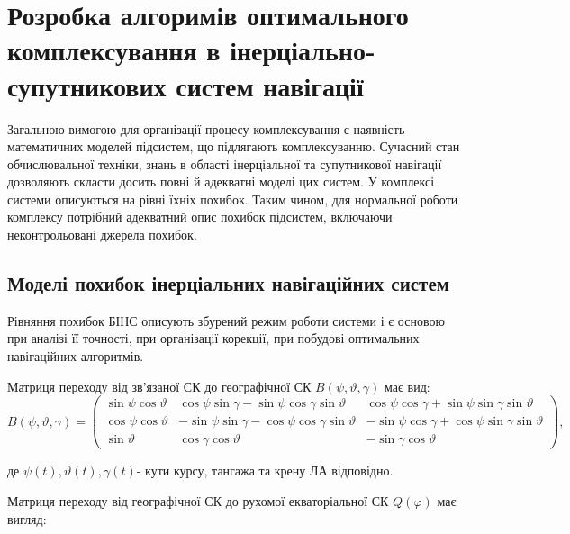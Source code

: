 \section{Розробка алгоримів оптимального комплексування в інерціально-супутникових
систем навігації}

Загальною вимогою для організації процесу комплексування є наявність математичних 
моделей підсистем, що підлягають комплексуванню. Сучасний стан обчислювальної техніки, 
знань в області інерціальної та супутникової навігації дозволяють скласти досить 
повні й адекватні моделі цих систем. У комплексі системи описуються на рівні їхніх 
похибок. Таким чином, для нормальної роботи комплексу потрібний адекватний опис похибок 
підсистем, включаючи неконтрольовані джерела похибок. 

\subsection{Моделі похибок  інерціальних навігаційних систем }

Рівняння похибок БІНС описують збурений режим роботи системи і є основою при аналізі 
її точності, при організації корекції, при побудові оптимальних навігаційних алгоритмів.

Матриця переходу від зв'язаної СК до географічної  СК  $B(\psi ,\vartheta ,\gamma )$ має 
вид:
\begin{equation}
\label{eq:noname_1} 
\scriptstyle
B(\psi ,\vartheta ,\gamma )=\left(
\begin{array}{ccc} 
{\scriptstyle \sin \psi \cos \vartheta } & 
{\scriptstyle\cos \psi \sin \gamma -\sin \psi \cos \gamma \sin \vartheta } & 
{\scriptstyle\cos \psi \cos \gamma +\sin \psi \sin \gamma \sin \vartheta } \\ 
{\scriptstyle\cos \psi \cos \vartheta } & 
{\scriptstyle-\sin \psi \sin \gamma -\cos \psi \cos \gamma \sin \vartheta } & 
{\scriptstyle-\sin \psi \cos \gamma +\cos \psi \sin \gamma \sin \vartheta } \\ 
{\scriptstyle\sin \vartheta } & 
{\scriptstyle\cos \gamma \cos \vartheta } & 
{\scriptstyle-\sin \gamma \cos \vartheta } 
\end{array}\right),
\end{equation}

\begin{ESKDexplanation}
\item де $\psi \left(t\right),\vartheta \left(t\right),\gamma \left(t\right)$- кути курсу, 
тангажа та крену ЛА відповідно. 
\end{ESKDexplanation}
Матриця переходу від географічної  СК до  рухомої 
екваторіальної СК $Q\left(\varphi \right)$ має вигляд:

